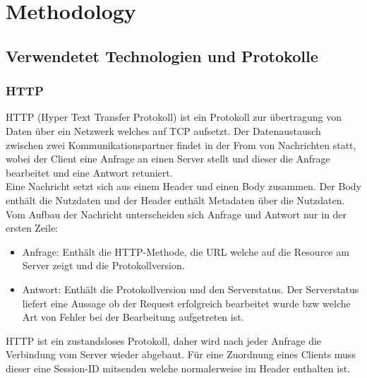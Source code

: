 \section{Methodology}
\label{sec:methodology}

\subsection{Verwendetet Technologien und Protokolle}
\label{sec:Verwendetet Technologien}

\subsubsection{HTTP}
\label{sec:HTTP}

HTTP (Hyper Text Transfer Protokoll) ist ein Protokoll zur übertragung von Daten über ein Netzwerk welches auf TCP aufsetzt.
Der Datenaustausch zwischen zwei Kommunikationspartner findet in der From von Nachrichten statt, 
wobei der Client eine Anfrage an einen Server stellt und dieser die Anfrage bearbeitet und eine Antwort retuniert.
\\
Eine Nachricht setzt sich aus einem Header und einen Body zusammen.
Der Body enthält die Nutzdaten und der Header enthält Metadaten über die Nutzdaten.
Vom Aufbau der Nachricht unterscheiden sich Anfrage und Antwort nur in der ersten Zeile:
\begin{itemize}
	\item Anfrage: Enthält die HTTP-Methode, die URL welche auf die Resource am Server zeigt und die Protokollversion.
	\item Antwort: Enthält die Protokollversion und den Serverstatus. 
		Der Serverstatus liefert eine Aussage ob der Request erfolgreich bearbeitet wurde bzw welche Art von Fehler bei der Bearbeitung aufgetreten ist.
\end{itemize}
HTTP ist ein zustandsloses Protokoll, daher wird nach jeder Anfrage die Verbindung vom Server wieder abgebaut.
Für eine Zuordnung eines Clients muss dieser eine Session-ID mitsenden welche normalerweise im Header enthalten ist.

